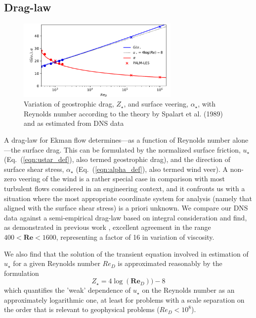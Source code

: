 \documentclass[smallcondensed,final]{svjour3}
\begin{document}
\subsection{Drag-law}
\label{sec:drag-law}
\begin{figure}
  \centerline{\includegraphics[width=0.7\textwidth]{../plot/ustar_alpha.pdf}}
  \caption{Variation of geostrophic drag, $Z_\star$, and surface veering, $\alpha_\star$, with Reynolds number according to
    the theory by Spalart et al. (1989) and as estimated from DNS data
    \label{fig:drag_law}}
\end{figure}
A drag-law for Ekman flow determines---as a function of Reynolds number alone---the surface drag.
%
This can be formulated by the normalized surface friction, $u_\star$ (Eq.~(\ref{eqn:ustar_def}), also termed geostrophic drag), 
and the direction of surface shear stress, $\alpha_\star$ (Eq.~(\ref{eqn:alpha_def}), also termed wind veer). 
%
A non-zero veering of the wind is a rather special case in comparison with most turbulent flows considered in an
engineering context, and it confronts us with a situation where the most appropriate coordinate system
for analysis (namely that aligned with the surface shear stress) is a priori unknown. 
%
We compare our DNS data against a semi-empirical drag-law based on integral consideration \citep{spalart:JFM1989}
and find, as demonstrated in previous work \citep{ansorge:BM2014}, excellent agreement in the range
 $400<\mathbf{Re}<1600$, representing a factor of 16 in variation of viscosity. 
%
\par
%
We also find that the solution of the transient equation involved in estimation of $u_\star$ for a given Reynolds number
$Re_D$ is approximated reasonably by the formulation
\begin{equation}
  Z_\star= 4\log(\mathbf{Re}_D))-8
  \label{eqn:zstar}
\end{equation}
which quantifies the 'weak' dependence of $u_\star$ on the Reynolds number as an approximately logarithmic one, at least
for problems with a scale separation on the order that is relevant to geophysical problems ($Re_D<10^{8}$).  
%
%
\end{document}
